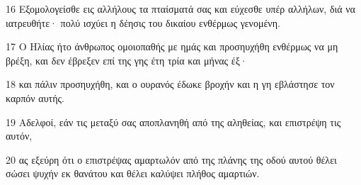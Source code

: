 \par 16 Εξομολογείσθε εις αλλήλους τα πταίσματά σας και εύχεσθε υπέρ αλλήλων, διά να ιατρευθήτε· πολύ ισχύει η δέησις του δικαίου ενθέρμως γενομένη.
\par 17 Ο Ηλίας ήτο άνθρωπος ομοιοπαθής με ημάς και προσηυχήθη ενθέρμως να μη βρέξη, και δεν έβρεξεν επί της γης έτη τρία και μήνας έξ·
\par 18 και πάλιν προσηυχήθη, και ο ουρανός έδωκε βροχήν και η γη εβλάστησε τον καρπόν αυτής.
\par 19 Αδελφοί, εάν τις μεταξύ σας αποπλανηθή από της αληθείας, και επιστρέψη τις αυτόν,
\par 20 ας εξεύρη ότι ο επιστρέψας αμαρτωλόν από της πλάνης της οδού αυτού θέλει σώσει ψυχήν εκ θανάτου και θέλει καλύψει πλήθος αμαρτιών.


